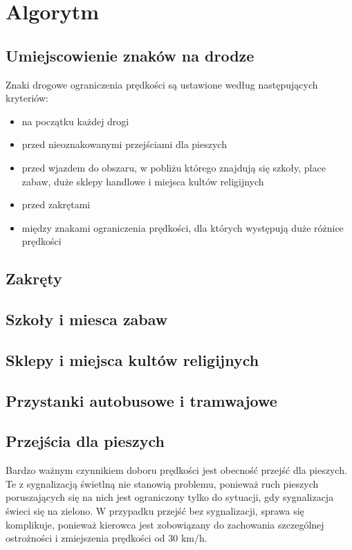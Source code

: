 \chapter{Algorytm}
\label{cha:Algorytm}

\newpage
\section{Umiejscowienie znaków na drodze}
\label{sec:speedLimitLocalization}
Znaki drogowe ograniczenia prędkości są ustawione według następujących kryteriów:
\begin{itemize}
\item na początku każdej drogi
\item przed nieoznakowanymi przejściami dla pieszych
\item przed wjazdem do obszaru, w pobliżu którego znajdują się szkoły, place zabaw, duże sklepy handlowe i miejsca kultów religijnych
\item przed zakrętami
\item między znakami ograniczenia prędkości, dla których występują duże różnice prędkości
\end{itemize}

\newpage
\section{Zakręty}
\label{sec:zakręty}

\newpage
\section{Szkoły i miesca zabaw}
\label{sec:zakręty}

\newpage
\section{Sklepy i miejsca kultów religijnych}
\label{sec:zakręty}

\newpage
\section{Przystanki autobusowe i tramwajowe}
\label{sec:zakręty}

\newpage
\section{Przejścia dla pieszych}
\label{sec:zakręty}

Bardzo ważnym czynnikiem doboru prędkości jest obecność przejść dla pieszych. Te z sygnalizacją świetlną nie stanowią problemu, ponieważ ruch pieszych poruszających się na nich jest ograniczony tylko do sytuacji, gdy sygnalizacja świeci się na zielono. W przypadku przejść bez sygnalizacji, sprawa się komplikuje, ponieważ kierowca jest zobowiązany do zachowania szczególnej ostrożności i zmiejszenia prędkości od 30 km/h. 


